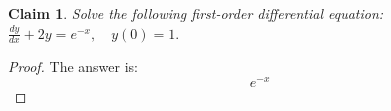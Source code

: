 \documentclass{article}
\newtheorem{theorem}{Claim}
\begin{document}
\begin{theorem}
Solve the following first-order differential equation:
$
\frac{dy}{dx} + 2y = e^{-x}, \quad y(0) = 1.
$
\end{theorem}

\begin{proof}
The answer is:
\[
e^{-x}
\]
\end{proof}
\end{document}
